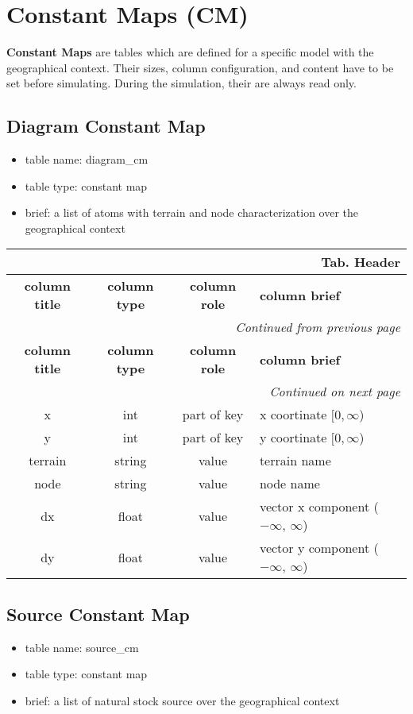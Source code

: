 \documentclass[a4paper,oneside,titlepage]{report}
\newcommand*{\LTHeaderIV}[5]{
  \multicolumn{4}{r}{\textbf{Tab. \thesubsection} \textbf{#1}}\\    
  \hline
  \textbf{#2} & \textbf{#3} & \textbf{#4} & \textbf{#5}\\
  \hline
  
  \endfirsthead
  \multicolumn{4}{r}{\textit{Continued from previous page}}\\    
  \hline
  \textbf{#2} & \textbf{#3} & \textbf{#4} & \textbf{#5}\\
  \hline
  \endhead
  \hline
  \multicolumn{4}{r}{\textit{Continued on next page}}\\
  \endfoot
  \hline
  \endlastfoot  
}
\begin{document}
\section{Constant Maps (CM)}
\textbf{Constant Maps} are tables which are defined for a specific model with the geographical context. Their sizes, column configuration, and content have to be set before simulating. During the simulation, their are always read only.

\subsection{Diagram Constant Map}
\begin{itemize}
  \setlength{\itemsep}{0pt}
  \setlength{\parskip}{0pt}
\item table name: diagram\_cm  
\item table type: constant map  
\item brief: a list of atoms with terrain and node characterization over the geographical context
\end{itemize}

\begin{longtable}{ |c|c|c|l| } 
  \LTHeaderIV{Header}{column title}{column type}{column role}{column brief}                    
  x & int & part of key & x coortinate $[0, \infty$)\\
  y & int & part of key & y coortinate $[0, \infty$)\\
  terrain & string & value & terrain name\\
  node & string & value & node name\\
  dx & float & value & vector x component ($-\infty$, $\infty$)\\
  dy & float & value & vector y component ($-\infty$, $\infty$)\\
\end{longtable}        

\subsection{Source Constant Map}
\begin{itemize}
  \setlength{\itemsep}{0pt}
  \setlength{\parskip}{0pt}
\item table name: source\_cm  
\item table type: constant map  
\item brief: a list of natural stock source over the geographical context
\end{itemize}
\end{document}
